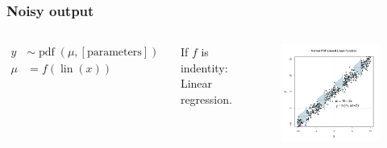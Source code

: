 \documentclass[usenames,dvipsnames,table]{beamer}
\begin{document}
\begin{frame}
\frametitle{Noisy output}
\begin{columns}
\begin{align*}
y &\sim \operatorname{pdf}(\mu, [\textrm{parameters}]) \\
\mu &= f(\operatorname{lin}(x))
\end{align*}

If $f$ is indentity: Linear regression.
\begin{figure}
\centering
\includegraphics[width=\textwidth]{img/fig15_9_1}
\end{figure}
\end{columns}
\end{frame}
\end{document}
